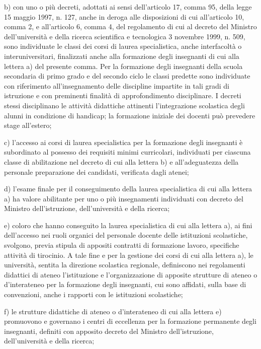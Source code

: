 b) con uno o più decreti, adottati ai sensi dell'articolo 17, comma 95, della legge 15 maggio 1997, n. 127, anche in deroga alle disposizioni di cui all'articolo 10, comma 2, e all'articolo 6, comma 4, del regolamento di cui al decreto del Ministro dell'università e della ricerca scientifica e tecnologica 3 novembre 1999, n. 509, sono individuate le classi dei corsi di laurea specialistica, anche interfacoltà o interuniversitari, finalizzati anche alla formazione degli insegnanti di cui alla lettera a) del presente comma. Per la formazione degli insegnanti della scuola secondaria di primo grado e del secondo ciclo le classi predette sono individuate con riferimento all'insegnamento delle discipline impartite in tali gradi di istruzione e con preminenti finalità di approfondimento disciplinare. I decreti stessi disciplinano le attività didattiche attinenti l'integrazione scolastica degli alunni in condizione di handicap; la formazione iniziale dei docenti può prevedere stage all'estero;

c) l'accesso ai corsi di laurea specialistica per la formazione degli insegnanti è subordinato al possesso dei requisiti minimi curricolari, individuati per ciascuna classe di abilitazione nel decreto di cui alla lettera b) e all'adeguatezza della personale preparazione dei candidati, verificata dagli atenei;

d) l'esame finale per il conseguimento della laurea specialistica di cui alla lettera a) ha valore abilitante per uno o più insegnamenti individuati con decreto del Ministro dell'istruzione, dell'università e della ricerca;

e) coloro che hanno conseguito la laurea specialistica di cui alla lettera a), ai fini dell'accesso nei ruoli organici del personale docente delle istituzioni scolastiche, svolgono, previa stipula di appositi contratti di formazione lavoro, specifiche attività di tirocinio. A tale fine e per la gestione dei corsi di cui alla lettera a), le università, sentita la direzione scolastica regionale, definiscono nei regolamenti didattici di ateneo l'istituzione e l'organizzazione di apposite strutture di ateneo o d'interateneo per la formazione degli insegnanti, cui sono affidati, sulla base di convenzioni, anche i rapporti con le istituzioni scolastiche;

f) le strutture didattiche di ateneo o d'interateneo di cui alla lettera e) promuovono e governano i centri di eccellenza per la formazione permanente degli insegnanti, definiti con apposito decreto del Ministro dell'istruzione, dell'università e della ricerca;

